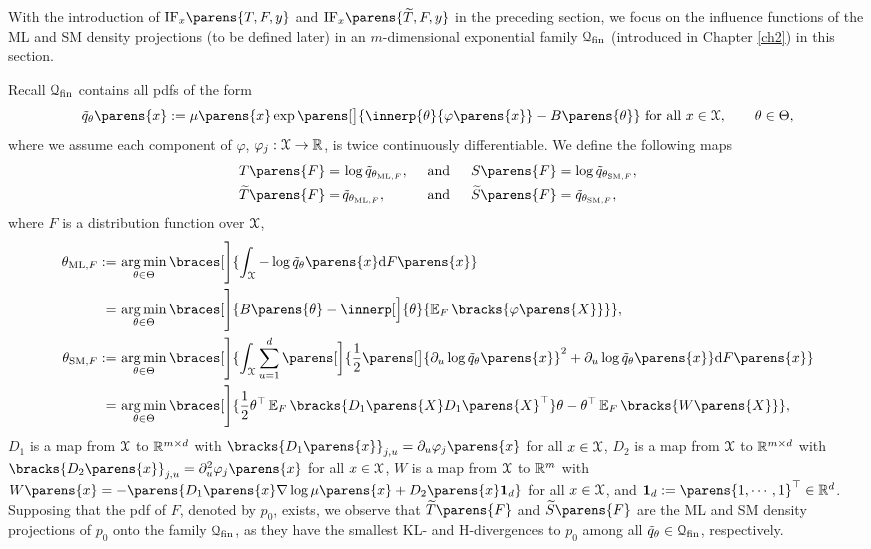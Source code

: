 With the introduction of $\mathrm{IF}_x \parens{T, F, y}$ and $\mathrm{IF}_x \parens{\widetilde{T}, F, y}$ in the preceding section, we focus on the influence functions of the ML and SM density projections (to be defined later) in an $m$-dimensional exponential family $\mathcal{Q}_{\mathrm{fin}}$ (introduced in Chapter \ref{ch2}) in this section. 

Recall $\mathcal{Q}_{\mathrm{fin}}$ contains all pdfs of the form 
\begin{align*}
	\tilde{q}_{\theta} \parens{x} := \mu \parens{x} \exp \parens[\big]{\innerp{\theta}{ \varphi \parens{x}} - B \parens{\theta}} \text{ for all } x \in \calX, \qquad \theta \in \Theta, 
\end{align*}
where we assume each component of $\varphi$, $\varphi_j: \mathcal{X} \to \mathbb{R}$, is twice continuously differentiable. We define the following maps 
\begin{align*}
	T \parens{F} = & \, \log \tilde{q}_{\theta_{\ML, F}},  && \, \text{ and }  && \, S \parens{F} = \log \tilde{q}_{\theta_{\SM, F}}, \\ 
	\widetilde{T} \parens{F} = & \, \tilde{q}_{\theta_{\ML, F}},  && \, \text{ and } && \, \widetilde{S} \parens{F} = \tilde{q}_{\theta_{\SM, F}}, 
\end{align*}
where $F$ is a distribution function over $\mathcal{X}$, 
\begin{align*}
	\theta_{\ML, F} := & \, \argmin_{\theta \in \Theta} \braces[\Bigg]{ \int_{\calX} - \log \tilde{q}_{\theta} \parens{x} \mathrm{d} F \parens{x} } \\ 
	= & \, \argmin_{\theta \in \Theta} \braces[\Bigg]{ B \parens{\theta} - \innerp[\Big]{\theta}{ \E_F \bracks{ \varphi \parens{X} } } }, \\ 
	\theta_{\SM, F} := & \, \argmin_{\theta \in \Theta} \braces[\Bigg]{ \int_{\calX} \sum_{u=1}^d \parens[\bigg]{ \frac{1}{2} \parens[\big]{ \partial_u \log \tilde{q}_{\theta} \parens{x}}^2 + \partial_u \log \tilde{q}_{\theta} \parens{x} } \diff F \parens{x} } \\ 
	= & \, \argmin_{\theta \in \Theta} \braces[\Bigg]{ \frac{1}{2} \theta^\top \E_F \bracks{D_1 \parens{X} D_1 \parens{X}^\top } \theta - \theta^\top \E_F \bracks{W \parens{X}}}, 
\end{align*}
$D_1$ is a map from $\mathcal{X}$ to $\mathbb{R}^{m \times d}$ with $\bracks{D_1 \parens{x}}_{j, u} = \partial_u \varphi_j \parens{x}$ for all $x \in \mathcal{X}$, $D_2$ is a map from $\mathcal{X}$ to $\mathbb{R}^{m \times d}$ with $\bracks{D_2 \parens{x}}_{j, u} = \partial_u^2 \varphi_j \parens{x}$ for all $x \in \mathcal{X}$, $W$ is a map from $\mathcal{X}$ to $\mathbb{R}^m$ with $W \parens{x} = - \parens{ D_1 \parens{x} \nabla \log \mu \parens{x} + D_2 \parens{x} \boldone_d}$ for all $x \in \mathcal{X}$, and $\boldone_d := \parens{1, \cdots, 1}^\top \in \Real^d$. Supposing that the pdf of $F$, denoted by $p_0$, exists, we observe that $\widetilde{T} \parens{F}$ and $\widetilde{S} \parens{F}$ are the ML and SM density projections of $p_0$ onto the family $\mathcal{Q}_{\mathrm{fin}}$, as they have the smallest KL- and H-divergences to $p_0$ among all $\tilde{q}_{\theta} \in \mathcal{Q}_{\mathrm{fin}}$, respectively. 

